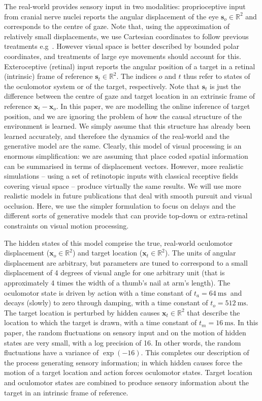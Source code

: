 \documentclass[a4paper]{article} %
\newcommand{\ms}{\si{\milli\second}}%
\begin{document}
The real-world provides sensory input in two modalities: proprioceptive input from cranial nerve nuclei reports the angular displacement of the eye $\bm{s}_o \in \mathbb{R}^2$ and corresponds to the centre of gaze. %
Note that, using the approximation of relatively small displacements, we use Cartesian coordinates to follow previous treatments e.g~\citep{Friston10d}. However visual space is better described by bounded polar coordinates, and treatments of large eye movements should account for this. %
Exteroceptive (retinal) input reports the angular position of a target in a retinal (intrinsic) frame of reference $\bm{s}_t \in \mathbb{R}^2$. The indices $o$ and $t$ thus refer to states of the oculomotor system or of the target, respectively. Note that $\bm{s}_t $ is just the difference between the centre of gaze and target location in an extrinsic frame of reference $\bm{x}_t - \bm{x}_o$. In this paper, we are modelling the online inference of target position, and we are ignoring the problem of how the causal structure of the environment is learned. We simply assume that this structure has already been learned accurately, and therefore the dynamics of the real-world and the generative model are the same. Clearly, this model of visual processing is an enormous simplification: we are assuming that place coded spatial information can be summarised in terms of displacement vectors. However, more realistic simulations -- using a set of retinotopic inputs with classical receptive fields covering visual space -- produce virtually the same results. We will use more realistic models in future publications that deal with smooth pursuit and visual occlusion. Here, we use the simpler formulation to focus on delays and the different sorts of generative models that can provide top-down or extra-retinal constraints on visual motion processing.

The hidden states of this model comprise the true, real-world oculomotor displacement ($\bm{x}_o \in \mathbb{R}^2$) and target location ($\bm{x}_t \in \mathbb{R}^2$). The units of angular displacement are arbitrary, but parameters are tuned to correspond to a small displacement of 4 degrees of visual angle for one arbitrary unit (that is approximately 4 times the width of a thumb's nail at arm's length). The oculomotor state is driven by action with a time constant of $t_a=64~\ms\ $ and decays (slowly) to zero through damping, with a time constant of $t_o = 512~\ms$. The target location is perturbed by hidden causes $\bm{x}_t \in \mathbb{R}^2$ that describe the location to which the target is drawn, with a time
constant of $t_m=16~\ms$. In this paper, the random fluctuations on sensory input and on the motion of hidden states are
very small, with a log precision of 16. In other words, the random fluctuations have a variance of $\exp(-16)$. This completes our description of the process generating sensory information; in which hidden causes force the motion of a target location and action forces oculomotor states. Target location and oculomotor states are combined to produce sensory information about the target in an intrinsic frame of reference.
\end{document}
